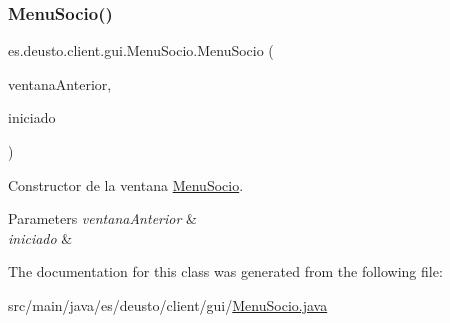 \subsubsection{\texorpdfstring{MenuSocio()}{MenuSocio()}}
{\footnotesize\ttfamily es.\+deusto.\+client.\+gui.\+Menu\+Socio.\+Menu\+Socio (\begin{DoxyParamCaption}\item[{J\+Frame}]{ventana\+Anterior,  }\item[{final \mbox{\hyperlink{classes_1_1deusto_1_1server_1_1dto_1_1_socio_d_t_o}{Socio\+D\+TO}}}]{iniciado }\end{DoxyParamCaption})}

Constructor de la ventana \mbox{\hyperlink{classes_1_1deusto_1_1client_1_1gui_1_1_menu_socio}{Menu\+Socio}}. 
\begin{DoxyParams}{Parameters}
{\em ventana\+Anterior} & \\
\hline
{\em iniciado} & \\
\hline
\end{DoxyParams}


The documentation for this class was generated from the following file\+:\begin{DoxyCompactItemize}
\item 
src/main/java/es/deusto/client/gui/\mbox{\hyperlink{_menu_socio_8java}{Menu\+Socio.\+java}}\end{DoxyCompactItemize}
